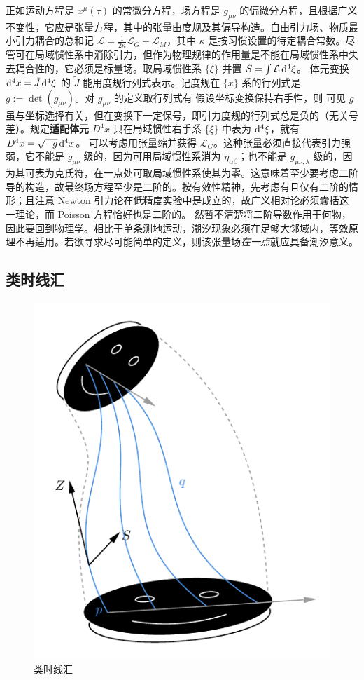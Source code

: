 正如运动方程是 $x^\mu(\tau)$ 的常微分方程，场方程是 $g_{\mu\nu}$ 的偏微分方程，且根据广义不变性，它应是张量方程，其中的张量由度规及其偏导构造。自由引力场、物质最小引力耦合的总和记 $\mathcal L=\frac{1}{2\kappa}\mathcal L_G +\mathcal L_M$，其中 $\kappa$ 是按习惯设置的待定耦合常数。尽管可在局域惯性系中消除引力，但作为物理规律的作用量是不能在局域惯性系中失去耦合性的，它必须是标量场。取局域惯性系 $\{\xi\}$ 并置 $S=\int \mathcal L \dd[4]{\xi}$。
体元变换 $\dd[4]x =\tilde J \dd[4]{\xi}$ 的 $\tilde J$ 能用度规行列式表示。记度规在 $\{x\}$ 系的行列式是 $g:=\det(g_{\mu\nu})$。对 $g_{\mu\nu}$ 的定义取行列式有
假设坐标变换保持右手性，则
可见 $g$ 虽与坐标选择有关，但在变换下一定保号，即引力度规的行列式总是负的（无关号差）。规定\textbf{适配体元} $D^4 x$ 只在局域惯性右手系 $\{\xi\}$ 中表为 $\dd[4]\xi$，就有 $D^4 x=\sqrt{-g}\dd[4]{x}$。
可以考虑用张量缩并获得 $\mathcal L_G$。这种张量必须直接代表引力强弱，它不能是 $g_{\mu\nu}$ 级的，因为可用局域惯性系消为 $\eta_{\alpha\beta}$；也不能是 $g_{\mu\nu,\lambda}$ 级的，因为其可表为克氏符，在一点处可取局域惯性系使其为零。这意味着至少要考虑二阶导的构造，故最终场方程至少是二阶的。按有效性精神，先考虑有且仅有二阶的情形；且注意 Newton 引力论在低精度实验中是成立的，故广义相对论必须囊括这一理论，而 Poisson 方程恰好也是二阶的。
然暂不清楚将二阶导数作用于何物，因此要回到物理学。相比于单条测地运动，潮汐现象必须在足够大邻域内，等效原理不再适用。若欲寻求尽可能简单的定义，则该张量场\textit{在一点}就应具备潮汐意义。

\subsection{类时线汇}\label{sec:time-cong}

\begin{figure}[ht]\centering
    \includegraphics[width=.5\textwidth]{fig/chpt01/geo-devi.pdf}
            \caption{类时线汇}
            \label{fig:geo-devi}
\end{figure}

